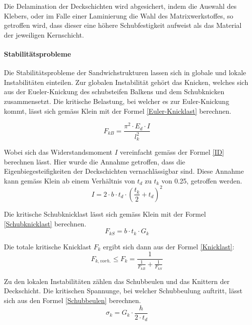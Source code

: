     Die Delamination der Deckschichten wird abgesichert, indem die Auswahl des Klebers, oder im Falle einer Laminierung die Wahl des Matrixwerkstoffes, so getroffen wird, dass dieser eine höhere Schubfestigkeit aufweist als das Material der jeweiligen Kernschicht.

    \paragraph{Stabilitätsprobleme}
    Die Stabilitätsprobleme der Sandwichstrukturen lassen sich in globale und lokale Instabilitäten einteilen. Zur globalen Instabilität gehört das Knicken, welches sich aus der Eueler-Knickung des schubsteifen Balkens und dem Schubknicken zusammensetzt. Die kritische Belastung, bei welcher es zur Euler-Knickung kommt, lässt sich gemäss Klein \cite{klein} mit der Formel \ref{Euler-Knicklast} berechnen.

    \begin{equation}
      \label{Euler-Knicklast}
      F_{kB}=\frac{\pi^2 \cdot E_d \cdot I}{l_k^{2}}
    \end{equation}

    Wobei sich das Widerstandsmoment $I$ vereinfacht gemäss der Formel \ref{ID} berechnen lässt. Hier wurde die Annahme getroffen, dass die Eigenbiegesteifigkeiten der Deckschichten vernachlässigbar sind. Diese Annahme kann gemäss Klein \cite{klein} ab einem Verhältnis von $t_d$ zu $t_k$ von 0.25, getroffen werden.
    \begin{equation}
      \label{ID}
      I= 2 \cdot b \cdot t_d \cdot \left( \frac{t_k}{2} + t_d \right )^{2}
    \end{equation}

    Die kritische Schubknicklast lässt sich gemäss Klein \cite{klein} mit der Formel \ref{Schubknicklast} berechnen.
    \begin{equation}
      \label{Schubknicklast}
      F_{kS} = b \cdot t_k \cdot G_k
    \end{equation}

    Die totale kritische Knicklast \(F_k\) ergibt sich dann aus der Formel \ref{Knicklast}:
    \begin{equation}
      \label{Knicklast}
      F_{k, vorh.} \leq F_k=\frac{1}{\frac{1}{F_{kB}}+\frac{1}{F_{kS}}}
    \end{equation}

    Zu den lokalen Instabilitäten zählen das Schubbeulen und das Knittern der Deckschicht. Die kritischen Spannunge, bei welcher Schubbeulung auftritt, lässt sich aus den Formel \ref{Schubbeulen} berechnen. \cite{ETH}
    \begin{equation}
      \label{Schubbeulen}
      \sigma_k = G_k \cdot \frac{h}{2 \cdot t_d}
    \end{equation}

